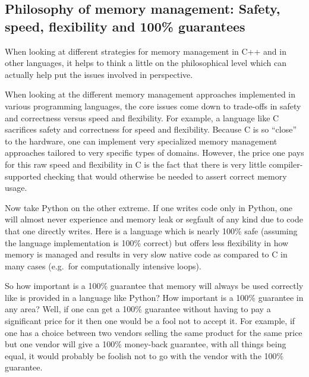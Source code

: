\documentclass[pdf,ps2pdf,11pt]{SANDreport}
\begin{document}
%
{}\subsection{Philosophy of memory management: Safety, speed,
flexibility and 100\% guarantees}
\label{sec:phylosophy-of-mem-mng}
%

When looking at different strategies for memory management in C++ and
in other languages, it helps to think a little on the philosophical
level which can actually help put the issues involved in perspective.

When looking at the different memory management approaches implemented
in various programming languages, the core issues come down to
trade-offs in safety and correctness versus speed and flexibility.
For example, a language like C sacrifices safety and correctness for
speed and flexibility.  Because C is so ``close'' to the hardware, one
can implement very specialized memory management approaches tailored
to very specific types of domains.  However, the price one pays for
this raw speed and flexibility in C is the fact that there is very
little compiler-supported checking that would otherwise be needed to
assert correct memory usage.

Now take Python on the other extreme.  If one writes code only in
Python, one will almost never experience and memory leak or segfault
of any kind due to code that one directly writes.  Here is a language
which is nearly 100\% safe (assuming the language implementation is
100\% correct) but offers less flexibility in how memory is managed
and results in very slow native code as compared to C in many cases
(e.g.\ for computationally intensive loops).

So how important is a 100\% guarantee that memory will always be used
correctly like is provided in a language like Python?  How important
is a 100\% guarantee in any area?  Well, if one can get a 100\%
guarantee without having to pay a significant price for it then one
would be a fool not to accept it.  For example, if one has a choice
between two vendors selling the same product for the same price but
one vendor will give a 100\% money-back guarantee, with all things
being equal, it would probably be foolish not to go with the vendor
with the 100\% guarantee.
\end{document}
